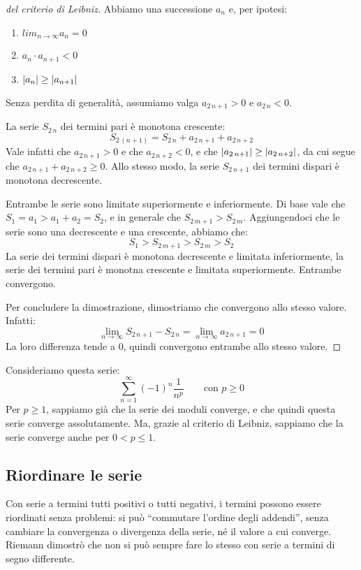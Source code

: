 \begin{proof}[del criterio di Leibniz]
Abbiamo una successione $a_n$ e, per ipotesi:
\begin{enumerate}
    \item $lim_{n \to \infty} a_n = 0$
    \item $a_n \cdot a_{n+1} < 0$
    \item $\left\lvert{a_n}\right\rvert \ge \left\lvert{a_{n+1}}\right\rvert$
\end{enumerate}
Senza perdita di generalit\`a, assumiamo valga $a_{2 \, n + 1} > 0$ e $a_{2 \, n} < 0$.

La serie $S_{2 \, n}$ dei termini pari \`e monotona crescente:
\[
S_{2 \, (n + 1)} = S_{2 \, n} + a_{2 \, n + 1} + a_{2 \, n + 2}
\]
Vale infatti che $a_{2 \, n + 1} > 0$ e che $a_{2 \, n + 2} < 0$, e che $\left\lvert{a_{2 \, n + 1}}\right\rvert \ge \left\lvert{a_{2 \, n + 2}}\right\rvert$, da cui segue che $a_{2 \, n + 1} + a_{2 \, n + 2} \ge 0$. Allo stesso modo, la serie $S_{2 \, n + 1}$ dei termini dispari \`e monotona decrescente.

Entrambe le serie sono limitate superiormente e inferiormente. Di base vale che $S_1 = a_1 > a_1 + a_2 = S_2$, e in generale che $S_{2 \, m + 1} > S_{2 \, m}$. Aggiungendoci che le serie sono una decrescente e una crescente, abbiamo che:
\[
S_1 > S_{2 \, m + 1} > S_{2 \, m} > S_2
\]
La serie dei termini dispari \`e monotona decrescente e limitata inferiormente, la serie dei termini pari \`e monotna crescente e limitata superiormente. Entrambe convergono.

Per concludere la dimostrazione, dimostriamo che convergono allo stesso valore. Infatti:
\[
\lim_{n \to \infty} S_{2 \, n + 1} - S_{2 \, n} = 
\lim_{n \to \infty} a_{2 \, n + 1} = 0
\]
La loro differenza tende a 0, quindi convergono entrambe allo stesso valore.
\end{proof}

Consideriamo questa serie:
\[
\sum_{n = 1}^{\infty} (-1)^n \frac{1}{n^p} \qquad \text{con } p \ge 0
\]
Per $p \ge 1$, sappiamo gi\`a che la serie dei moduli converge, e che quindi questa serie converge assolutamente. Ma, grazie al criterio di Leibniz, sappiamo che la serie converge anche per $0 < p \le 1$.

\subsection{Riordinare le serie}

Con serie a termini tutti positivi o tutti negativi, i termini possono essere riordinati senza problemi: si pu\`o ``commutare l'ordine degli addendi'', senza cambiare la convergenza o divergenza della serie, n\'e il valore a cui converge. Riemann dimostr\`o che non si pu\`o sempre fare lo stesso con serie a termini di segno differente.

